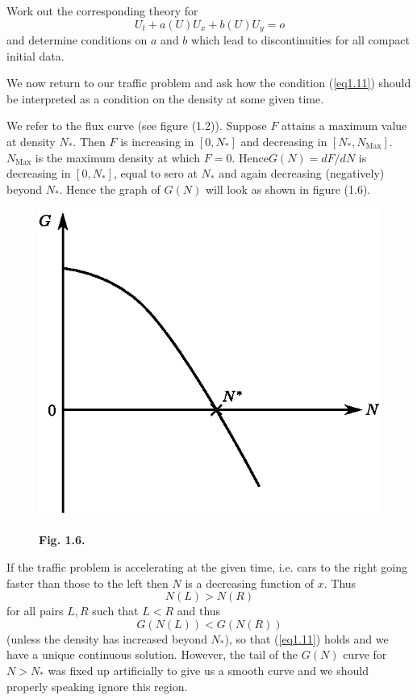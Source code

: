 \begin{exercise}\label{chap1:exer1.2}
Work out the corresponding theory for 
$$
U_t + a (U) U_x  + b(U) U_y = o
$$
and determine conditions on $a$ and $b$ which lead to discontinuities for all compact initial data.

We now return to our traffic problem and ask how the condition (\ref{eq1.11}) should be interpreted as a condition on the density at some given time.
\end{exercise}

We refer to the flux curve (see figure (1.2)). Suppose $F$ attains a maximum value at density $N_\ast$. Then $F$ is increasing in $[0, N_*]$ and decreasing in $[N_*, N_{\text{Max}}]$. $N_{\text{Max}}$ is the maximum density at which $F=0$. Hence\pageoriginale $G(N) = dF/dN$ is decreasing in $[0, N_*]$, equal to sero at $N_*$ and again decreasing (negatively) beyond $N_*$. Hence the graph of $G(N)$ will look as shown in figure (1.6).

\begin{figure}[H]
\centering
\includegraphics{figures/fig1.6.eps}
\centerline{\bf Fig. 1.6.}
\end{figure}

If the traffic problem is accelerating at the given time, i.e. cars to the right going faster than those to the left then $N$ is a decreasing function of $x$. Thus
$$
N(L) > N(R)
$$
for all pairs $L,R$ such that $L<R$ and thus 
$$
G(N(L)) < G(N(R))
$$
(unless the density has increased beyond $N_*$), so that (\ref{eq1.11}) holds and we have a unique continuous solution. However, the tail of the $G(N)$ curve for $N > N_*$ was fixed up artificially to give us a smooth curve and we should properly speaking ignore this region.

